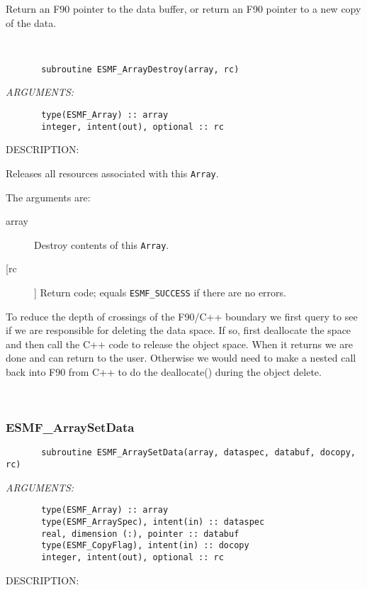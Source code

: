  
   Return an F90 pointer to the data buffer, or return an F90 pointer 
   to a new copy of the data. 
    
 
\mbox{}\hrulefill\ 
 

\begin{verbatim}       subroutine ESMF_ArrayDestroy(array, rc)\end{verbatim}{\em ARGUMENTS:}
\begin{verbatim}       type(ESMF_Array) :: array
       integer, intent(out), optional :: rc\end{verbatim}
{\sf DESCRIPTION:\\ }


   Releases all resources associated with this {\tt Array}.
  
   The arguments are:
   \begin{description}
  
   \item[array]
   Destroy contents of this {\tt Array}.
  
   \item[[rc]]
   Return code; equals {\tt ESMF\_SUCCESS} if there are no errors.
  
   \end{description}
  
   To reduce the depth of crossings of the F90/C++ boundary we first
   query to see if we are responsible for deleting the data space. If so,
   first deallocate the space and then call the C++ code to release
   the object space. When it returns we are done and can return to the user.
   Otherwise we would need to make a nested call back into F90 from C++ to do
   the deallocate() during the object delete.
   
 
\mbox{}\hrulefill\ 
 
\subsubsection [ESMF\_ArraySetData] {ESMF\_ArraySetData}


  
\begin{verbatim}       subroutine ESMF_ArraySetData(array, dataspec, databuf, docopy, rc)\end{verbatim}{\em ARGUMENTS:}
\begin{verbatim}       type(ESMF_Array) :: array
       type(ESMF_ArraySpec), intent(in) :: dataspec
       real, dimension (:), pointer :: databuf
       type(ESMF_CopyFlag), intent(in) :: docopy
       integer, intent(out), optional :: rc\end{verbatim}
{\sf DESCRIPTION:\\ }


